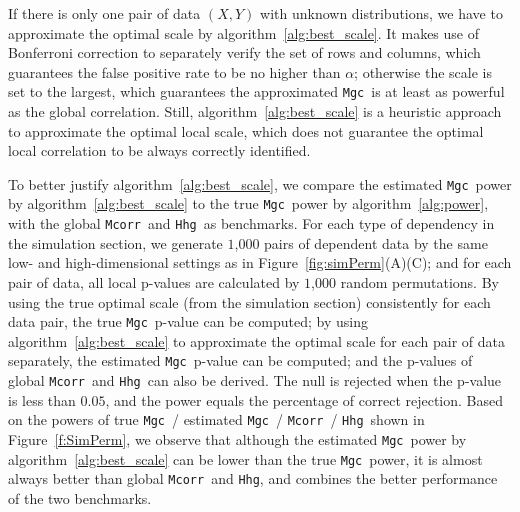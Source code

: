 \documentclass[11pt]{article}
\providecommand{\sct}[1]{{\sc \texttt{#1}}}
\newcommand{\Mgc}{\sct{Mgc}}
\newcommand{\Hhg}{\sct{Hhg}}
\newcommand{\Mcorr}{\sct{Mcorr}}
\begin{document}
If there is only one pair of data $(X,Y)$ with unknown distributions, we have to approximate the optimal scale by algorithm~\ref{alg:best_scale}. It makes use of Bonferroni correction to separately verify the set of rows and columns, which guarantees the false positive rate to be no higher than $\alpha$; otherwise the scale is set to the largest, which guarantees the approximated \Mgc~is at least as powerful as the global correlation. Still, algorithm~\ref{alg:best_scale} is a heuristic approach to approximate the optimal local scale, which does not guarantee the optimal local correlation to be always correctly identified.


To better justify algorithm~\ref{alg:best_scale}, we compare the estimated \Mgc~power by algorithm~\ref{alg:best_scale} to the true \Mgc~power by algorithm~\ref{alg:power}, with the global \Mcorr~and \Hhg~as benchmarks. For each type of dependency in the simulation section, we generate $1$,$000$ pairs of dependent data by the same low- and high-dimensional settings as in Figure~\ref{fig:simPerm}(A)(C); and for each pair of data, all local p-values are calculated by $1$,$000$ random permutations. By using the true optimal scale (from the simulation section) consistently for each data pair, the true \Mgc~p-value can be computed; by using algorithm~\ref{alg:best_scale} to approximate the optimal scale for each pair of data separately, the estimated \Mgc~p-value can be computed; and the p-values of global \Mcorr~and \Hhg~can also be derived. The null is rejected when the p-value is less than $0.05$, and the power equals the percentage of correct rejection. Based on the powers of true \Mgc~/ estimated \Mgc~/ \Mcorr~/ \Hhg~shown in Figure~\ref{f:SimPerm}, we observe that although the estimated \Mgc~power by algorithm~\ref{alg:best_scale} can be lower than the true \Mgc~power, it is almost always better than global \Mcorr~and \Hhg, and combines the better performance of the two benchmarks.
\end{document}

